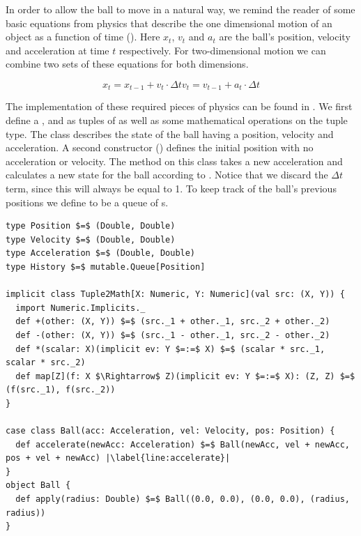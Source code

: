 In order to allow the ball to move in a natural way, we remind the reader of some basic equations from physics that describe the one dimensional motion of an object as a function of time (). Here $x_t$, $v_t$ and $a_t$ are the ball's position, velocity and acceleration at time $t$ respectively. For two-dimensional motion we can combine two sets of these equations for both dimensions.

\begin{subequations}
	\begin{equation}
		x_t = x_{t - 1} + v_t \cdot \Delta t
	\end{equation}
	\begin{equation}
		v_t = v_{t - 1} + a_t \cdot \Delta t
	\end{equation}
	\label{eq:motion}
\end{subequations}

The implementation of these required pieces of physics can be found in . We first define a ,  and  as tuples of  as well as some mathematical operations on the tuple type. The  class describes the state of the ball having a position, velocity and acceleration. A second constructor () defines the initial position with no acceleration or velocity. The method  on this class takes a new acceleration and calculates a new state for the ball according to . Notice that we discard the $\Delta t$ term, since this will always be equal to 1. To keep track of the ball's previous positions we define  to be a queue of s.

\hspace*{-\parindent}
\begin{minipage}{\linewidth}
\begin{lstlisting}[style=ScalaStyle, caption={Ball motion physics}, label={lst:ball-physics}]
type Position $=$ (Double, Double)
type Velocity $=$ (Double, Double)
type Acceleration $=$ (Double, Double)
type History $=$ mutable.Queue[Position]

implicit class Tuple2Math[X: Numeric, Y: Numeric](val src: (X, Y)) {
  import Numeric.Implicits._
  def +(other: (X, Y)) $=$ (src._1 + other._1, src._2 + other._2)
  def -(other: (X, Y)) $=$ (src._1 - other._1, src._2 - other._2)
  def *(scalar: X)(implicit ev: Y $=:=$ X) $=$ (scalar * src._1, scalar * src._2)
  def map[Z](f: X $\Rightarrow$ Z)(implicit ev: Y $=:=$ X): (Z, Z) $=$ (f(src._1), f(src._2))
}

case class Ball(acc: Acceleration, vel: Velocity, pos: Position) {
  def accelerate(newAcc: Acceleration) $=$ Ball(newAcc, vel + newAcc, pos + vel + newAcc) |\label{line:accelerate}|
}
object Ball {
  def apply(radius: Double) $=$ Ball((0.0, 0.0), (0.0, 0.0), (radius, radius))
}
\end{lstlisting}
\end{minipage}

